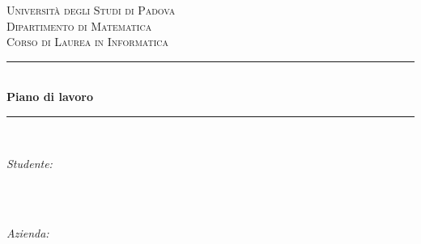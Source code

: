 \begin{titlepage}

\newcommand{\HRule}{\rule{\linewidth}{0.5mm}} 

\center
 

\textsc{\LARGE Università degli Studi di Padova}\\[1.5cm] 

\textsc{\Large Dipartimento di Matematica}\\[0.5cm] 

\textsc{\large Corso di Laurea in Informatica}\\[0.5cm] 


\HRule \\[0.4cm]
{ \huge \bfseries Piano di lavoro}\\[0.4cm] %
\HRule \\[1.5cm]
 

\begin{minipage}{0.4\textwidth}
\begin{flushleft} \large
\emph{Studente:}\\
\nomeStudente\ \textsc{\cognomeStudente}
\end{flushleft}
\end{minipage}
~
\begin{minipage}{0.4\textwidth}
\begin{flushright} \large
\emph{Azienda:} \\
\ragioneSocAzienda
\end{flushright}
\end{minipage}\\[2cm]



\end{titlepage}
